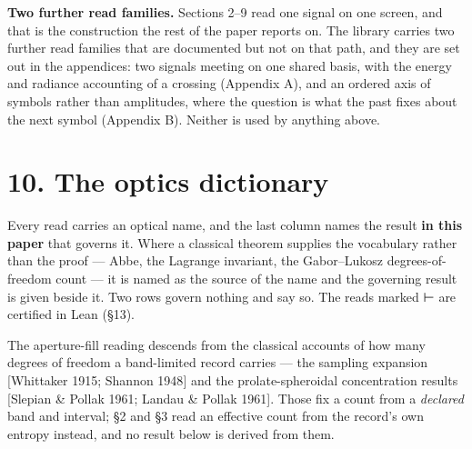 \documentclass[10pt,letterpaper,twocolumn]{article}
\begin{document}
\textbf{Two further read families.} Sections 2--9 read one signal on one screen, and that is the construction the rest of the paper reports on. The library carries two further read families that are documented but not on that path, and they are set out in the appendices: two signals meeting on one shared basis, with the energy and radiance accounting of a crossing (Appendix A), and an ordered axis of symbols rather than amplitudes, where the question is what the past fixes about the next symbol (Appendix B). Neither is used by anything above.

\section{10. The optics dictionary}\label{10-the-optics-dictionary}

Every read carries an optical name, and the last column names the result \textbf{in this paper} that governs it. Where a classical theorem supplies the vocabulary rather than the proof --- Abbe, the Lagrange invariant, the Gabor--Lukosz degrees-of-freedom count --- it is named as the source of the name and the governing result is given beside it. Two rows govern nothing and say so. The reads marked ⊢ are certified in Lean (§13).

The aperture-fill reading descends from the classical accounts of how many degrees of freedom a band-limited record carries --- the sampling expansion {[}Whittaker 1915; Shannon 1948{]} and the prolate-spheroidal concentration results {[}Slepian \& Pollak 1961; Landau \& Pollak 1961{]}. Those fix a count from a \emph{declared} band and interval; §2 and §3 read an effective count from the record's own entropy instead, and no result below is derived from them.
\end{document}

